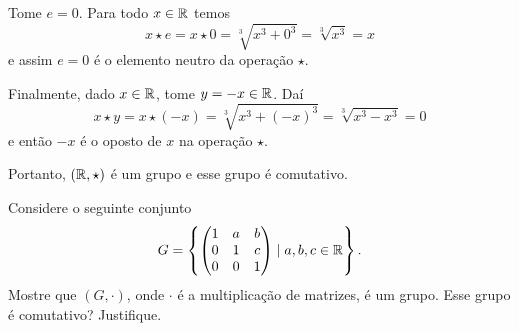 \documentclass[12pt]{exam}
\begin{document}
    Tome $e = 0$. Para todo $x \in \mathbb{R}$ temos
    \[
        x\star e = x \star 0 = \sqrt[3]{x^3 + 0^3} = \sqrt[3]{x^3} = x
    \]
    e assim $e = 0$ é o elemento neutro da operação $\star$.

    Finalmente, dado $x \in \mathbb{R}$, tome $y = -x \in \mathbb{R}$. Daí
    \[
        x \star y = x \star (-x) = \sqrt[3]{x^3 + (-x)^3} = \sqrt[3]{x^3 - x^3} = 0
    \]
    e então $-x$ é o oposto de $x$ na operação $\star$.

    Portanto, $(\mathbb{R}, \star)$ é um grupo e esse grupo é comutativo.
    \vspace{1cm}

    \questao Considere o seguinte conjunto
    \[
        G = \left\{\begin{pmatrix} 1 & a & b\\ 0 & 1 & c \\ 0 & 0 & 1\end{pmatrix} \mid a, b, c \in \mathbb{R}\right\}.
    \]
    Mostre que $(G, \cdot)$, onde $\cdot$ é a multiplicação de matrizes, é um grupo. Esse grupo é comutativo? Justifique.
\end{document}
